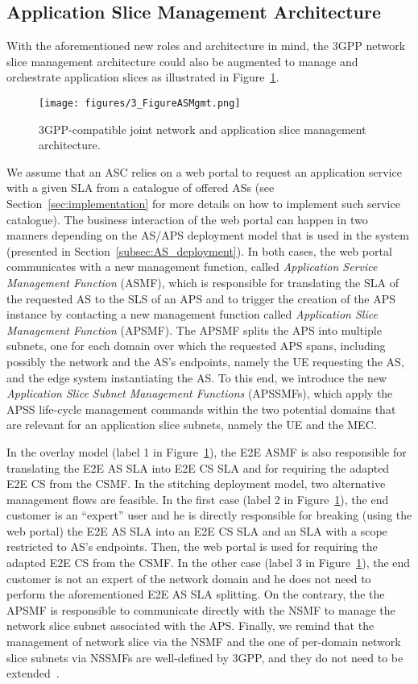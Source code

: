 \subsection{Application Slice Management Architecture}
\label{subsec:AS_Mgmt}
\noindent
%
With the aforementioned new roles and architecture in mind, the 3GPP network slice management architecture could also be augmented to manage and orchestrate application slices as illustrated in Figure~\ref{fig:aps_mngmt}.
%
\begin{figure}[ht]
\centering
\texttt{[image: figures/3\_FigureASMgmt.png]}
\caption{3GPP-compatible joint network and application slice management architecture.}
\label{fig:aps_mngmt}
\vspace{-0.2cm}
\end{figure}
%
We assume that an ASC relies on a web portal to request an application service with a given SLA from a catalogue of offered ASs (see Section~\ref{sec:implementation} for more details on how to implement such service catalogue). The business interaction of the web portal can happen in two manners depending on the AS/APS deployment model that is used in the system (presented in Section~\ref{subsec:AS_deployment}). In both cases, the web portal communicates with a new management function, called \textit{Application Service Management Function} (ASMF), which is responsible for translating the SLA of the requested AS to the SLS of an APS and to trigger the creation of the APS instance by contacting a new management function called \textit{Application Slice Management Function} (APSMF). The APSMF splits the APS into multiple subnets, one for each domain over which the requested APS spans, including possibly the network and the AS's endpoints, namely the UE requesting the AS, and the edge system instantiating the AS. To this end, we introduce the new \textit{Application Slice Subnet Management Functions} (APSSMFs), which apply the APSS life-cycle management commands within the two potential domains that are relevant for an application slice subnets, namely the UE and the MEC.

In the overlay model (label 1 in Figure~\ref{fig:aps_mngmt}), the E2E ASMF is also responsible for translating the E2E AS SLA into E2E CS SLA and for requiring the adapted E2E CS from the CSMF. In the stitching deployment model, two alternative management flows are feasible. In the first case (label 2 in Figure~\ref{fig:aps_mngmt}), the end customer is an ``expert'' user and he is directly responsible for breaking (using the web portal) the E2E AS SLA into an E2E CS SLA and an SLA with a scope restricted to AS's endpoints. Then, the web portal is used for requiring the adapted E2E CS from the CSMF. In the other case (label 3 in Figure~\ref{fig:aps_mngmt}), the end customer is not an expert of the network domain and he does not need to perform the aforementioned E2E AS SLA splitting. On the contrary, the the APSMF is responsible to communicate directly with the NSMF to manage the network slice subnet associated with the APS. Finally, we remind that the management of network slice via the NSMF and the one of per-domain network slice subnets via NSSMFs are well-defined by 3GPP, and they do not need to be extended~\cite{3GPPTS28531,3GPPTS28541}. 

